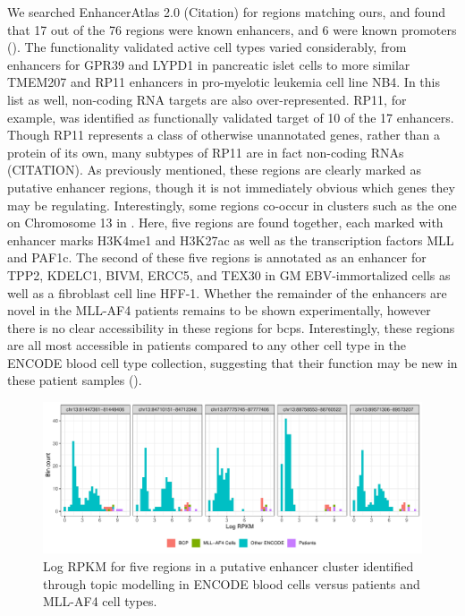 We searched EnhancerAtlas 2.0 (Citation) for regions matching ours, and found that 17 out of the 76 regions were known enhancers, and 6 were known promoters (). The functionality validated active cell types varied considerably, from enhancers for GPR39 and LYPD1 in pancreatic islet cells to more similar TMEM207 and RP11 enhancers in pro-myelotic leukemia cell line NB4. In this list as well, non-coding RNA targets are also over-represented. RP11, for example, was identified as functionally validated target of 10 of the 17 enhancers. Though RP11 represents a class of otherwise unannotated genes, rather than a protein of its own, many subtypes of RP11 are in fact non-coding RNAs (CITATION). As previously mentioned, these regions are clearly marked as putative enhancer regions, though it is not immediately obvious which genes they may be regulating. Interestingly, some regions co-occur in clusters such as the one on Chromosome 13 in . Here, five regions are found together, each marked with enhancer marks H3K4me1 and H3K27ac as well as the transcription factors MLL and PAF1c. The second of these five regions is annotated as an enhancer for TPP2, KDELC1, BIVM, ERCC5, and TEX30 in GM EBV-immortalized cells as well as a fibroblast cell line HFF-1. Whether the remainder of the enhancers are novel in the MLL-AF4 patients remains to be shown experimentally, however there is no clear accessibility in these regions for \glspl{bcp}. Interestingly, these regions are all most accessible in patients compared to any other cell type in the ENCODE blood cell type collection, suggesting that their function may be new in these patient samples (). 

\begin{figure}
    \centering
    \includegraphics[width=\textwidth]{plot/ch5/pt_compared_to_encode.pdf}
    \caption{Log RPKM for five regions in a putative enhancer cluster identified through topic modelling in ENCODE blood cells versus patients and MLL-AF4 cell types.}
    \label{fig:encode_pt_regions}
\end{figure}


